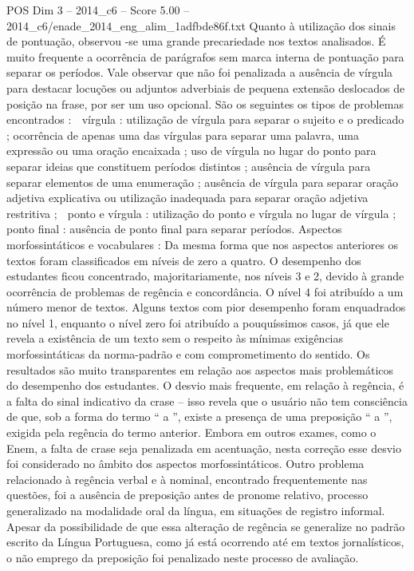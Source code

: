 \begin{textsample}{POS Dim 3 – 2014\_c6 – Score 5.00 – 2014\_c6/enade\_2014\_eng\_alim\_1adfbde86f.txt}
Quanto à utilização dos sinais de pontuação, observou -se uma grande precariedade nos textos analisados.
É muito frequente a ocorrência de parágrafos sem marca interna de pontuação para separar os períodos.
Vale observar que não foi penalizada a ausência de vírgula para destacar locuções ou adjuntos adverbiais de pequena extensão deslocados de posição na frase, por ser um uso opcional.
São os seguintes os tipos de problemas encontrados :  vírgula : utilização de vírgula para separar o sujeito e o predicado ; ocorrência de apenas uma das vírgulas para separar uma palavra, uma expressão ou uma oração encaixada ; uso de vírgula no lugar do ponto para separar ideias que constituem períodos distintos ; ausência de vírgula para separar elementos de uma enumeração ; ausência de vírgula para separar oração adjetiva explicativa ou utilização inadequada para separar oração adjetiva restritiva ;  ponto e vírgula : utilização do ponto e vírgula no lugar de vírgula ;  ponto final : ausência de ponto final para separar períodos.
Aspectos morfossintáticos e vocabulares : Da mesma forma que nos aspectos anteriores os textos foram classificados em níveis de zero a quatro.
O desempenho dos estudantes ficou concentrado, majoritariamente, nos níveis 3 e 2, devido à grande ocorrência de problemas de regência e concordância.
O nível 4 foi atribuído a um número menor de textos.
Alguns textos com pior desempenho foram enquadrados no nível 1, enquanto o nível zero foi atribuído a pouquíssimos casos, já que ele revela a existência de um texto sem o respeito às mínimas exigências morfossintáticas da norma-padrão e com comprometimento do sentido.
Os resultados são muito transparentes em relação aos aspectos mais problemáticos do desempenho dos estudantes.
O desvio mais frequente, em relação à regência, é a falta do sinal indicativo da crase – isso revela que o usuário não tem consciência de que, sob a forma do termo “ a ”, existe a presença de uma preposição “ a ”, exigida pela regência do termo anterior.
Embora em outros exames, como o Enem, a falta de crase seja penalizada em acentuação, nesta correção esse desvio foi considerado no âmbito dos aspectos morfossintáticos.
Outro problema relacionado à regência verbal e à nominal, encontrado frequentemente nas questões, foi a ausência de preposição antes de pronome relativo, processo generalizado na modalidade oral da língua, em situações de registro informal.
Apesar da possibilidade de que essa alteração de regência se generalize no padrão escrito da Língua Portuguesa, como já está ocorrendo até em textos jornalísticos, o não emprego da preposição foi penalizado neste processo de avaliação.

\end{textsample}
